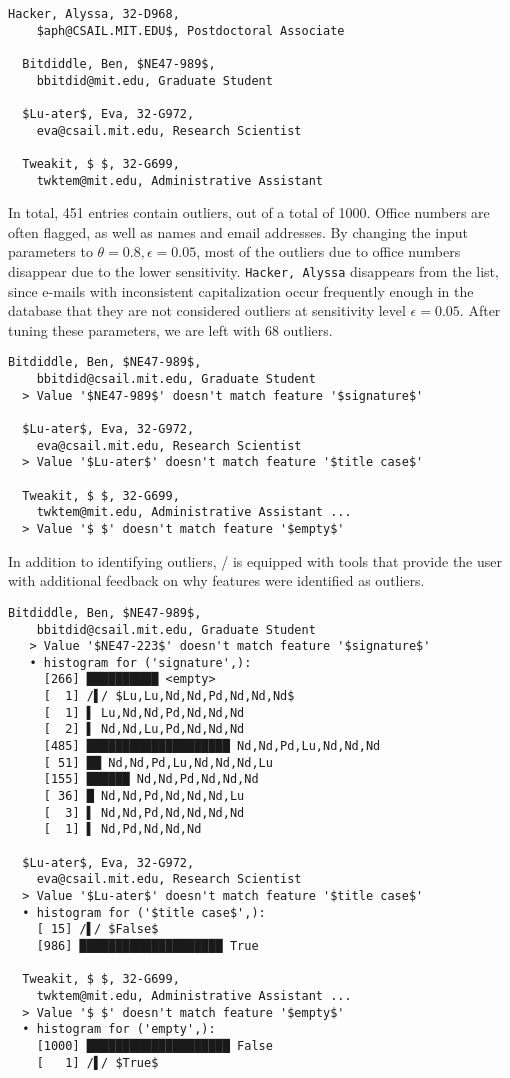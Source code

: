 \begin{lstlisting}[gobble=2]
  Hacker, Alyssa, 32-D968,
    $aph@CSAIL.MIT.EDU$, Postdoctoral Associate

  Bitdiddle, Ben, $NE47-989$,
    bbitdid@mit.edu, Graduate Student

  $Lu-ater$, Eva, 32-G972,
    eva@csail.mit.edu, Research Scientist

  Tweakit, $ $, 32-G699,
    twktem@mit.edu, Administrative Assistant
\end{lstlisting}

In total, 451 entries contain outliers, out of a total of 1000. Office numbers are often flagged, as well as names and email addresses. By changing the input parameters to $\theta = 0.8, \epsilon = 0.05$, most of the outliers due to office numbers disappear due to the lower sensitivity. \lstinline{Hacker, Alyssa} disappears from the list, since e-mails with inconsistent capitalization occur frequently enough in the database that they are not considered outliers at sensitivity level $\epsilon = 0.05$. After tuning these parameters, we are left with 68 outliers.

\begin{lstlisting}[gobble=2]
  Bitdiddle, Ben, $NE47-989$,
    bbitdid@csail.mit.edu, Graduate Student
  > Value '$NE47-989$' doesn't match feature '$signature$'

  $Lu-ater$, Eva, 32-G972,
    eva@csail.mit.edu, Research Scientist
  > Value '$Lu-ater$' doesn't match feature '$title case$'

  Tweakit, $ $, 32-G699,
    twktem@mit.edu, Administrative Assistant ...
  > Value '$ $' doesn't match feature '$empty$'
\end{lstlisting}

In addition to identifying outliers, \dBoost/ is equipped with tools that provide the user with additional feedback on why features were identified as outliers.

\begin{lstlisting}[gobble=2]
  Bitdiddle, Ben, $NE47-989$,
    bbitdid@csail.mit.edu, Graduate Student
   > Value '$NE47-223$' doesn't match feature '$signature$'
   • histogram for ('signature',):
     [266] ██████████ <empty>
     [  1] /▌/ $Lu,Lu,Nd,Nd,Pd,Nd,Nd,Nd$
     [  1] ▌ Lu,Nd,Nd,Pd,Nd,Nd,Nd
     [  2] ▌ Nd,Nd,Lu,Pd,Nd,Nd,Nd
     [485] ████████████████████ Nd,Nd,Pd,Lu,Nd,Nd,Nd
     [ 51] ██ Nd,Nd,Pd,Lu,Nd,Nd,Nd,Lu
     [155] ██████ Nd,Nd,Pd,Nd,Nd,Nd
     [ 36] █ Nd,Nd,Pd,Nd,Nd,Nd,Lu
     [  3] ▌ Nd,Nd,Pd,Nd,Nd,Nd,Nd
     [  1] ▌ Nd,Pd,Nd,Nd,Nd

  $Lu-ater$, Eva, 32-G972,
    eva@csail.mit.edu, Research Scientist
  > Value '$Lu-ater$' doesn't match feature '$title case$'
  • histogram for ('$title case$',):
    [ 15] /▌/ $False$
    [986] ████████████████████ True

  Tweakit, $ $, 32-G699,
    twktem@mit.edu, Administrative Assistant ...
  > Value '$ $' doesn't match feature '$empty$'
  • histogram for ('empty',):
    [1000] ████████████████████ False
    [   1] /▌/ $True$
\end{lstlisting}

